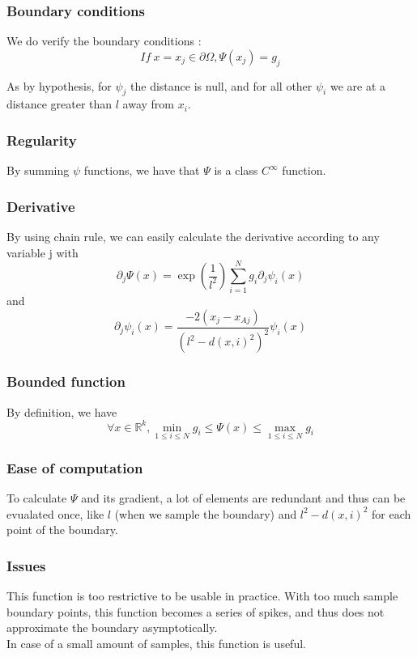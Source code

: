 \documentclass{article}
\theoremstyle{definition}
\theoremstyle{property}
\theoremstyle{remark}
\begin{document}
	\subsubsection{Boundary conditions} 
	We do verify the boundary conditions :
	\begin{equation*}
		If \ x=x_j\in \partial \Omega, \Psi(x_j) = g_j
	\end{equation*}

	As by hypothesis, for $\psi_j$ the distance is null, and for all other $\psi_i$ we are at a distance greater than $l$ away from $x_i$.

	\subsubsection{Regularity}
	By summing $\psi$ functions, we have that $\Psi$ is a class $C^\infty$ function.

	\subsubsection{Derivative}
	By using chain rule, we can easily calculate the derivative according to any variable j with
	\begin{equation*}
		\partial_j \Psi(x) = \exp\left(\frac{1}{l^2}\right)\sum_{i=1}^{N}g_i\partial_j\psi_i(x)
	\end{equation*}
	and
	\begin{equation*}
		\partial_j\psi_i(x) = \frac{-2(x_j-x_{Aj})}{(l^2 - d(x,i)^2)^2}\psi_i(x)
	\end{equation*}

	\subsubsection{Bounded function}
	By definition, we have
	\begin{equation*}
		\forall x \in \mathbb{R}^k, \min_{1 \leq i \leq N}g_i \leq \Psi(x) \leq \max_{1 \leq i \leq N}g_i
	\end{equation*}

	\subsubsection{Ease of computation}
	To calculate $\Psi$ and its gradient, a lot of elements are redundant and thus can be evualated once, like $l$ (when we sample the boundary) and $l^2-d(x,i)^2$ for each point of the boundary.

	\subsubsection{Issues}
	This function is too restrictive to be usable in practice. With too much sample boundary points, this function becomes a series of spikes, and thus does not approximate the boundary asymptotically.\\
	In case of a small amount of samples, this function is useful.
\end{document}
